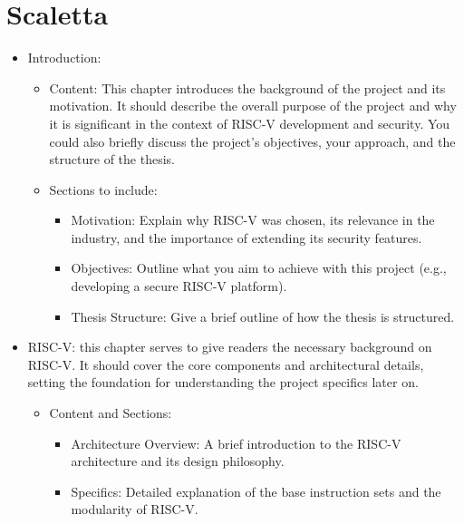 \chapter*{Scaletta}
\label{cha:Scaletta}

\begin{itemize}
  \item Introduction:
    \begin{itemize}
      \item Content: This chapter introduces the background of the project and
        its motivation. It should describe the overall purpose of the project and
        why it is significant in the context of RISC-V development and security.
        You could also briefly discuss the project’s objectives, your approach,
        and the structure of the thesis.

      \item Sections to include:
        \begin{itemize}
          \item Motivation: Explain why RISC-V was chosen, its relevance in the industry,
            and the importance of extending its security features.

          \item Objectives: Outline what you aim to achieve with this project (e.g.,
            developing a secure RISC-V platform).

          \item Thesis Structure: Give a brief outline of how the thesis is
            structured.
        \end{itemize}
    \end{itemize}

  \item RISC-V: this chapter serves to give readers the necessary background on
    RISC-V. It should cover the core components and architectural details,
    setting the foundation for understanding the project specifics later on.
    \begin{itemize}
      \item Content and Sections:

        \begin{itemize}
          \item Architecture Overview: A brief introduction to the RISC-V
            architecture and its design philosophy.

          \item Specifics: Detailed explanation of the base instruction sets and
            the modularity of RISC-V.


\end{itemize}
\end{itemize}
\end{itemize}

